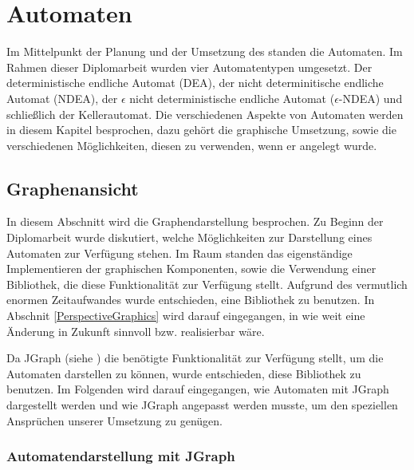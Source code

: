 



\chapter{Automaten}\label{Machines}

Im Mittelpunkt der Planung und der Umsetzung des \gtitools standen die Automaten.
Im Rahmen dieser Diplomarbeit wurden vier Automatentypen umgesetzt. Der
deterministische endliche Automat (DEA), der nicht determinitische endliche
Automat (NDEA), der $\epsilon$ nicht deterministische endliche Automat
($\epsilon$-NDEA) und schließlich der Kellerautomat. Die verschiedenen Aspekte
von Automaten werden in diesem Kapitel besprochen, dazu gehört die graphische
Umsetzung, sowie die verschiedenen Möglichkeiten, diesen zu verwenden, wenn er
angelegt wurde.\vspace{10pt}


\section{Graphenansicht}\label{Graph}

In diesem Abschnitt wird die Graphendarstellung besprochen. Zu Beginn der
Diplomarbeit wurde diskutiert, welche Möglichkeiten zur Darstellung eines
Automaten zur Verfügung stehen. Im Raum standen das eigenständige
Implementieren der graphischen Komponenten, sowie die Verwendung einer
Bibliothek, die diese Funktionalität zur Verfügung stellt. Aufgrund des
vermutlich enormen Zeitaufwandes wurde entschieden, eine Bibliothek zu benutzen.
In Abschnit \ref{PerspectiveGraphics} wird darauf eingegangen, in wie weit eine
Änderung in Zukunft sinnvoll bzw. realisierbar wäre.\vspace{10pt} 

Da JGraph (siehe \cite{jgraph}) die benötigte Funktionalität zur Verfügung
stellt, um die Automaten darstellen zu können, wurde entschieden, diese
Bibliothek zu benutzen. Im Folgenden wird darauf eingegangen, wie Automaten mit
JGraph dargestellt werden und wie JGraph angepasst werden musste, um den
speziellen Ansprüchen unserer Umsetzung zu genügen.\vspace{10pt}


\subsection{Automatendarstellung mit JGraph}\label{GraphJGraph}

